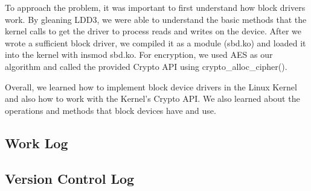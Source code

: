 \documentclass[journal, letterpaper, draftclsnofoot, onecolumn, 10pt]{IEEEtran}
\begin{document}
To approach the problem, it was important to first understand how block drivers work.
By gleaning LDD3, we were able to understand the basic methods that the kernel calls to get the driver to process reads and writes on the device.
After we wrote a sufficient block driver, we compiled it as a module (sbd.ko) and loaded it into the kernel with insmod sbd.ko.
For encryption, we used AES as our algorithm and called the provided Crypto API using crypto\_alloc\_cipher().  







Overall, we learned how to implement block device drivers in the Linux Kernel and also how to work with the Kernel's Crypto API.
We also learned about the operations and methods that block devices have and use. \\


\subsection{Work Log}




\clearpage
\subsection{Version Control Log}



\FloatBarrier



\scalebox{0.8}{
}


\FloatBarrier
\end{document}
